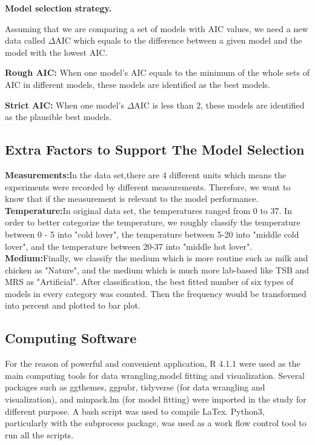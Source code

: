 \documentclass[11pt]{article}
\begin{document}
  \textbf{Model selection strategy.}

  Assuming that we are comparing a set of models with AIC values, we need a new data called $\Delta$AIC which equals to the difference between a given model and the model with the lowest AIC.

  \textbf{Rough AIC:}  When one model's AIC equals to the minimum of the whole sets of AIC in different models, these models are identified as the best models.

  \textbf{Strict AIC:} When one model's $\Delta$AIC is less than 2\cite{raftery_bayesian_1995},  these models are identified as the plausible best models.

\subsection{Extra Factors to Support The Model Selection}
\linenumbers
    \textbf{Measurements:}In the data set,there are 4 different units which means the experiments were recorded by different measurements. Therefore, we want to know that if the measurement is relevant to the model performance.   
     \newline
    \textbf{Temperature:}In original data set, the temperatures ranged from 0 to 37. In order to better categorize the temperature\cite{de_silvestri_determination_2018}, we roughly classify the temperature between 0 - 5 into  "cold lover", the temperature between 5-20 into "middle cold lover", and the temperature between 20-37 into "middle hot lover".
    \newline
    \textbf{Medium:}Finally, we classify the medium which is more routine such as milk and chicken as "Nature", and the medium which is much more lab-based like TSB and MRS as "Artificial". 
    \newline
      After classification, the best fitted number of six types of models in every category was counted. Then the frequency would be transformed into percent and plotted to bar plot.
    

\subsection{Computing Software}
\linenumbers
  For the reason of powerful and convenient application, R 4.1.1 were used as the main computing tools for data wrangling,model fitting and visualization. Several packages such as ggthemes, ggpubr, tidyverse (for data wrangling and visualization), and minpack.lm (for model fitting) were imported in the study for different purpose. A bash script was used to compile LaTex. Python3, particularly with the subprocess package, was used as a work flow control tool to run all the scripts.
  
\end{document}
